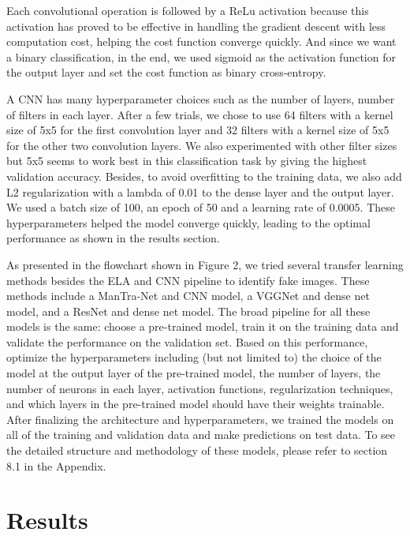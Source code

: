 \documentclass[11pt]{article}
\begin{document}
Each convolutional operation is followed by a ReLu activation because this activation has proved to be effective in handling the gradient descent with less computation cost, helping the cost function converge quickly. And since we want a binary classification, in the end, we used sigmoid as the activation function for the output layer and set the cost function as binary cross-entropy.

A CNN has many hyperparameter choices such as the number of layers, number of filters in each layer. After a few trials, we chose to use 64 filters with a kernel size of 5x5 for the first convolution layer and 32 filters with a kernel size of 5x5 for the other two convolution layers. We also experimented with other filter sizes but 5x5 seems to work best in this classification task by giving the highest validation accuracy. Besides, to avoid overfitting to the training data, we also add L2 regularization with a lambda of 0.01 to the dense layer and the output layer. We used a batch size of 100, an epoch of 50 and a learning rate of 0.0005. These hyperparameters helped the model converge quickly, leading to the optimal performance as shown in the results section.

As presented in the flowchart shown in Figure 2, we tried several transfer learning methods besides the ELA and CNN pipeline to identify fake images. These methods include a ManTra-Net and CNN model, a VGGNet and dense net model, and a ResNet and dense net model. The broad pipeline for all these models is the same: choose a pre-trained model, train it on the training data and validate the performance on the validation set. Based on this performance, optimize the hyperparameters including (but not limited to) the choice of the model at the output layer of the pre-trained model, the number of layers, the number of neurons in each layer, activation functions, regularization techniques, and which layers in the pre-trained model should have their weights trainable. After finalizing the architecture and hyperparameters, we trained the models on all of the training and validation data and make predictions on test data. To see the detailed structure and methodology of these models, please refer to section 8.1 in the Appendix.

\section{Results}
\end{document}
